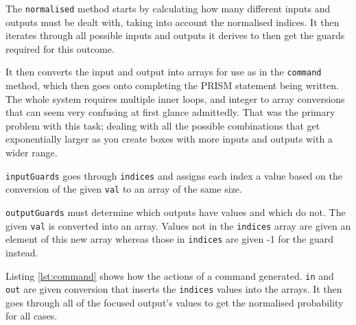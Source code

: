 \documentclass[report.tex]{subfiles}
\begin{document}


The \texttt{normalised} method starts by calculating how many different inputs
and outputs must be dealt with, taking into account the normalised indices.
It then iterates through all possible inputs and outputs it derives to then
get the guards required for this outcome.

It then converts the input and output into arrays for use as in the
\texttt{command} method, which then goes onto completing the PRISM statement
being written. The whole system requires multiple inner loops, and integer to
array conversions that can seem very confusing at first glance admittedly.
That was the primary problem with this task; dealing with all the possible
combinations that get exponentially larger as you create boxes with more inputs
and outputs with a wider range.

\texttt{inputGuards} goes through \texttt{indices} and assigns each index a
value based on the conversion of the given \texttt{val} to an array of the same
size.

\texttt{outputGuards} must determine which outputs have values and which do not.
The given \texttt{val} is converted into an array. Values not in the
\texttt{indices} array are given an element of this new array whereas those
in \texttt{indices} are given -1 for the guard instead.



Listing \ref{lst:command} shows how the actions of a command generated.
\texttt{in} and \texttt{out} are given conversion that inserts the
\texttt{indices} values into the arrays. It then goes through all of the
focused output's values to get the normalised probability for all cases.

\newpage
\end{document}
